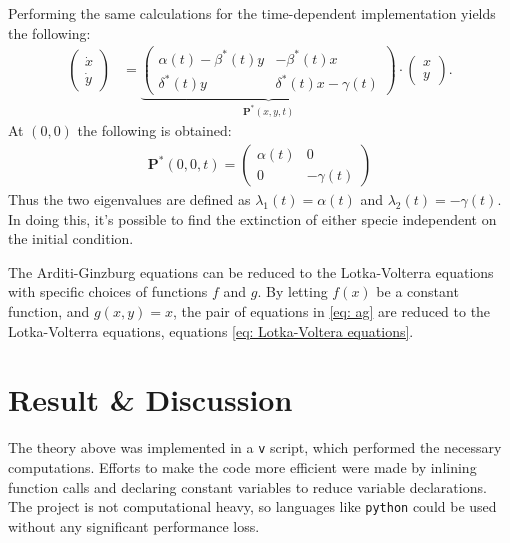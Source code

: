 \documentclass[a4paper]{article}
\newcommand{\newparagraph}{\vspace{.5cm}\noindent}
\begin{document}
\newparagraph
Performing the same calculations for the time-dependent implementation yields the following:
\begin{align}
    \begin{pmatrix}
        \dot{x}\\
        \dot{y}
    \end{pmatrix} &= \underbrace{\begin{pmatrix}
        \alpha(t) - \beta^*(t) y & - \beta^*(t) x \\
        \delta^*(t) y & \delta^*(t) x -\gamma(t)       
    \end{pmatrix}}_{\mathbf{P}^*(x, y, t)}\cdot\begin{pmatrix}
        x\\
        y
    \end{pmatrix}.
\end{align}At $(0,0)$ the following is obtained:
\begin{align*}
    \mathbf{P}^*(0,0,t) = \begin{pmatrix}
        \alpha(t) & 0 \\
        0 & -\gamma(t)
    \end{pmatrix}
\end{align*}
Thus the two eigenvalues are defined as $\lambda_1(t) = \alpha(t)$ and $\lambda_2(t) = -\gamma(t)$. In doing this, it's possible to find the extinction of either specie independent on the initial condition.

\newparagraph
The Arditi-Ginzburg equations can be reduced to the Lotka-Volterra equations with specific choices of functions $f$ and $g$. By letting $f(x)$ be a constant function, and $g(x,y) = x$, the pair of equations in \eqref{eq: ag} are reduced to the Lotka-Volterra equations, equations \eqref{eq: Lotka-Voltera equations}.
\newpage
\section{Result \& Discussion}
The theory above was implemented in a \verb|v| script, which performed the necessary computations. Efforts to make the code more efficient were made by inlining function calls and declaring constant variables to reduce variable declarations. The project is not computational heavy, so languages like \verb|python| could be used without any significant performance loss.
\end{document}
